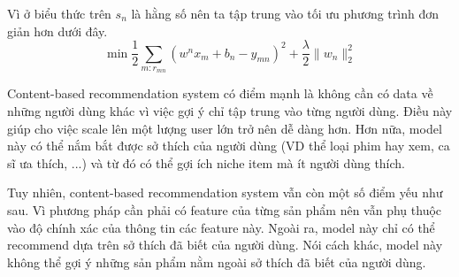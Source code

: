 Vì ở biểu thức trên $s_n$ là hằng số nên ta tập trung vào tối ưu phương trình đơn giản hơn dưới đây.
\begin{equation}
    \min \frac{1}{2} \underset{m:r_{m n}}{\sum} (w^n x_m + b_n - y_{m n})^2 + 
    \frac{\lambda}{2} \|w_n\|^2_2 
\end{equation}

Content-based recommendation system có điểm mạnh là không cần có data về những người dùng khác vì việc gợi ý chỉ tập trung vào từng người dùng. Điều này giúp cho việc scale lên một lượng user lớn trở nên dễ dàng hơn. Hơn nữa, model này có thể nắm bắt được sở thích của người dùng (VD thể loại phim hay xem, ca sĩ ưa thích, ...) và từ đó có thể gợi ích niche item mà ít người dùng thích.

Tuy nhiên, content-based recommendation system vẫn còn một số điểm yếu như sau. Vì phương pháp cần phải có feature của từng sản phẩm nên vẫn phụ thuộc vào độ chính xác của thông tin các feature này. Ngoài ra, model này chỉ có thể recommend dựa trên sở thích đã biết của người dùng. Nói cách khác, model này không thể gợi ý những sản phẩm nằm ngoài sở thích đã biết của người dùng.
